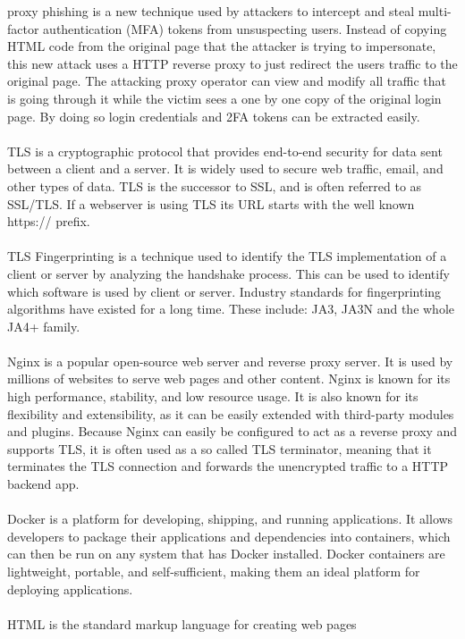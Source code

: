 \documentclass[12pt]{scrbook}
\begin{document}
proxy phishing is a new technique used by attackers to intercept and steal
multi-factor authentication (MFA) tokens from unsuspecting users. Instead of
copying HTML code from the original page that the attacker is trying to
impersonate, this new attack uses a HTTP reverse proxy to just redirect the
users traffic to the original page. The attacking proxy operator can view and
modify all traffic that is going through it while the victim sees a one by one
copy of the original login page. By doing so login credentials and 2FA tokens
can be extracted easily.\\ \\ TLS is a cryptographic protocol that provides
end-to-end security for data sent between a client and a server. It is widely
used to secure web traffic, email, and other types of data. TLS is the successor
to SSL, and is often referred to as SSL/TLS. If a webserver is using TLS its URL
starts with the well known https:// prefix.\\ \\ TLS Fingerprinting is a
technique used to identify the TLS implementation of a client or server by
analyzing the handshake process. This can be used to identify which software is
used by client or server. Industry standards for fingerprinting algorithms have
existed for a long time. These include: JA3, JA3N and the whole JA4+ family.\\
\\ Nginx is a popular open-source web server and reverse proxy server. It is
used by millions of websites to serve web pages and other content. Nginx is
known for its high performance, stability, and low resource usage. It is also
known for its flexibility and extensibility, as it can be easily extended with
third-party modules and plugins. Because Nginx can easily be configured to act
as a reverse proxy and supports TLS, it is often used as a so called TLS
terminator, meaning that it terminates the TLS connection and forwards the
unencrypted traffic to a HTTP backend app.\\ \\ Docker is a platform for
developing, shipping, and running applications. It allows developers to package
their applications and dependencies into containers, which can then be run on
any system that has Docker installed. Docker containers are lightweight,
portable, and self-sufficient, making them an ideal platform for deploying
applications.\\ \\ HTML is the standard markup language for creating web pages
\end{document}
